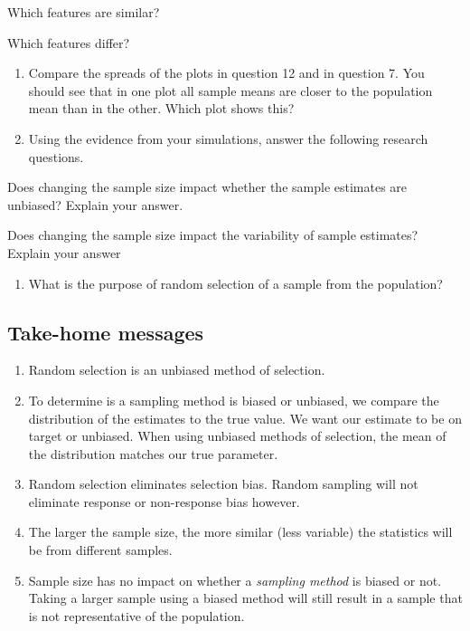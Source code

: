 \documentclass[
]{report}
\providecommand{\tightlist}{%
  \setlength{\itemsep}{0pt}\setlength{\parskip}{0pt}}
\newcommand{\rgi}{\hspace{24pt}}  %
\begin{document}
\rgi Which features are similar?\\
\vspace{0.4in}

\rgi Which features differ?

\vspace{0.4in}

\newpage

\begin{enumerate}
\def\labelenumi{\arabic{enumi}.}
\setcounter{enumi}{13}
\item
  Compare the spreads of the plots in question 12 and in question 7. You should see that in one plot all sample means are closer to the population mean than in the other. Which plot shows this?
  \vspace{0.4in}
\item
  Using the evidence from your simulations, answer the following research questions.
\end{enumerate}

\rgi Does changing the sample size impact whether the sample estimates are unbiased? Explain your answer.
\vspace{0.5in}

\rgi Does changing the sample size impact the variability of sample estimates? Explain your answer
\vspace{0.5in}

\begin{enumerate}
\def\labelenumi{\arabic{enumi}.}
\setcounter{enumi}{15}
\tightlist
\item
  What is the purpose of random selection of a sample from the population?
\end{enumerate}

\vspace{0.8in}

\hypertarget{take-home-messages-2}{%
\subsection{Take-home messages}\label{take-home-messages-2}}

\begin{enumerate}
\def\labelenumi{\arabic{enumi}.}
\item
  Random selection is an unbiased method of selection.
\item
  To determine is a sampling method is biased or unbiased, we compare the distribution of the estimates to the true value. We want our estimate to be on target or unbiased. When using unbiased methods of selection, the mean of the distribution matches our true parameter.
\item
  Random selection eliminates selection bias. Random sampling will not eliminate response or non-response bias however.
\item
  The larger the sample size, the more similar (less variable) the statistics will be from different samples.
\item
  Sample size has no impact on whether a \emph{sampling method} is biased or not. Taking a larger sample using a biased method will still result in a sample that is not representative of the population.
\end{enumerate}
\end{document}
